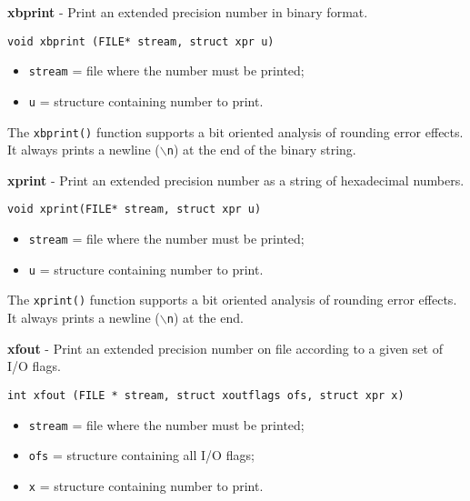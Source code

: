 \documentclass{article}
\begin{document}
\hrulefill{}

\textbf{xbprint} - Print an extended precision number in binary format.

\begin{verbatim}
void xbprint (FILE* stream, struct xpr u)
\end{verbatim}

\begin{itemize}
\item \texttt{stream} = file where the number must be printed;
\item \texttt{u}      = structure containing number to print.
\end{itemize}

The \texttt{xbprint()} function supports a bit oriented analysis of
rounding error effects. It always prints a newline (\texttt{$\backslash$n})
at the end of the binary string.


\hrulefill{}

\textbf{xprint} - Print an extended precision number as a string of 
hexadecimal numbers.

\begin{verbatim}
void xprint(FILE* stream, struct xpr u)
\end{verbatim}

\begin{itemize}
\item \texttt{stream} = file where the number must be printed;
\item \texttt{u}      = structure containing number to print.
\end{itemize}

The \texttt{xprint()} function supports a bit oriented analysis of
rounding error effects. It always prints a newline (\texttt{$\backslash$n})
at the end.


\hrulefill{}

\textbf{xfout} - Print an extended precision number on file according to 
a given set of I/O flags.

\begin{verbatim}
int xfout (FILE * stream, struct xoutflags ofs, struct xpr x)
\end{verbatim}

\begin{itemize}
\item \texttt{stream} = file where the number must be printed;
\item \texttt{ofs}    = structure containing all I/O flags;
\item \texttt{x}      = structure containing number to print.
\end{itemize}
\end{document}
